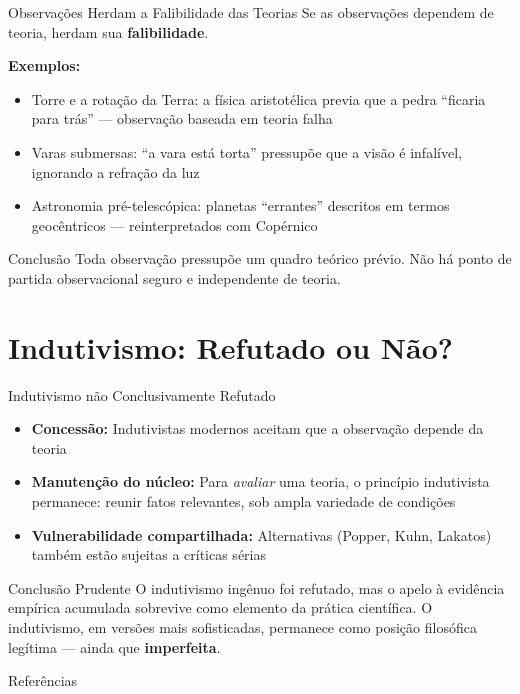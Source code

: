 \documentclass[aspectratio=169]{beamer}
\newcommand{\impt}[1]{\textcolor{maccent}{\textbf{#1}}}
\newcommand{\ntc}[1]{\textcolor{mprimary}{#1}}
\begin{document}
\begin{frame}{Observações Herdam a Falibilidade das Teorias}
  Se as observações dependem de teoria, herdam sua \impt{falibilidade}.

  \vspace{0.3cm}
  \textbf{Exemplos:}
  \begin{itemize}
    \item \ntc{Torre e a rotação da Terra:} a física aristotélica previa que a pedra ``ficaria para trás'' --- observação baseada em teoria falha
    \pause
    \item \ntc{Varas submersas:} ``a vara está torta'' pressupõe que a visão é infalível, ignorando a refração da luz
    \pause
    \item \ntc{Astronomia pré-telescópica:} planetas ``errantes'' descritos em termos geocêntricos --- reinterpretados com Copérnico
  \end{itemize}

  \vspace{0.3cm}
  \pause
  \begin{alertblock}{Conclusão}
    Toda observação pressupõe um quadro teórico prévio. Não há ponto de partida observacional seguro e independente de teoria.
  \end{alertblock}
\end{frame}

\section{Indutivismo: Refutado ou Não?}

\begin{frame}{Indutivismo não Conclusivamente Refutado}
  \begin{itemize}
    \item \textbf{Concessão:} Indutivistas modernos aceitam que a observação depende da teoria
    \pause
    \item \textbf{Manutenção do núcleo:} Para \textit{avaliar} uma teoria, o princípio indutivista permanece: reunir fatos relevantes, sob ampla variedade de condições
    \pause
    \item \textbf{Vulnerabilidade compartilhada:} Alternativas (Popper, Kuhn, Lakatos) também estão sujeitas a críticas sérias
  \end{itemize}

  \vspace{0.4cm}
  \pause
  \begin{block}{Conclusão Prudente}
    O indutivismo ingênuo foi refutado, mas o apelo à evidência empírica acumulada sobrevive como elemento da prática científica. O indutivismo, em versões mais sofisticadas, permanece como posição filosófica legítima --- ainda que \impt{imperfeita}.
  \end{block}
\end{frame}

\begin{frame}[allowframebreaks]{Referências}
  
  
\end{frame}
\end{document}

